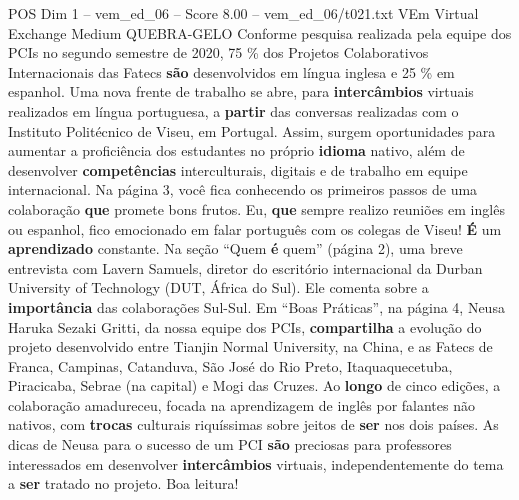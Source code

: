 \begin{textsample}{POS Dim 1 – vem\_ed\_06 – Score 8.00 – vem\_ed\_06/t021.txt}  \label{ex:f1_pos_129}
VEm Virtual Exchange Medium QUEBRA-GELO Conforme pesquisa realizada pela equipe dos PCIs no segundo semestre de 2020, 75 \% dos Projetos Colaborativos Internacionais das Fatecs \textbf{são} desenvolvidos em língua inglesa e 25 \% em espanhol.
Uma nova frente de trabalho se abre, para \textbf{intercâmbios} virtuais realizados em língua portuguesa, a \textbf{partir} das conversas realizadas com o Instituto Politécnico de Viseu, em Portugal.
Assim, surgem oportunidades para aumentar a proficiência dos estudantes no próprio \textbf{idioma} nativo, além de desenvolver \textbf{competências} interculturais, digitais e de trabalho em equipe internacional.
Na página 3, você fica conhecendo os primeiros passos de uma colaboração \textbf{que} promete bons frutos.
Eu, \textbf{que} sempre realizo reuniões em inglês ou espanhol, fico emocionado em falar português com os colegas de Viseu! \textbf{É} um \textbf{aprendizado} constante.
Na seção “Quem \textbf{é} quem” (página 2), uma breve entrevista com Lavern Samuels, diretor do escritório internacional da Durban University of Technology (DUT, África do Sul).
Ele comenta sobre a \textbf{importância} das colaborações Sul-Sul.
Em “Boas Práticas”, na página 4, Neusa Haruka Sezaki Gritti, da nossa equipe dos PCIs, \textbf{compartilha} a evolução do projeto desenvolvido entre Tianjin Normal University, na China, e as Fatecs de Franca, Campinas, Catanduva, São José do Rio Preto, Itaquaquecetuba, Piracicaba, Sebrae (na capital) e Mogi das Cruzes.
Ao \textbf{longo} de cinco edições, a colaboração amadureceu, focada na aprendizagem de inglês por falantes não nativos, com \textbf{trocas} culturais riquíssimas sobre jeitos de \textbf{ser} nos dois países.
As dicas de Neusa para o sucesso de um PCI \textbf{são} preciosas para professores interessados em desenvolver \textbf{intercâmbios} virtuais, independentemente do tema a \textbf{ser} tratado no projeto.
Boa leitura!

\end{textsample}
